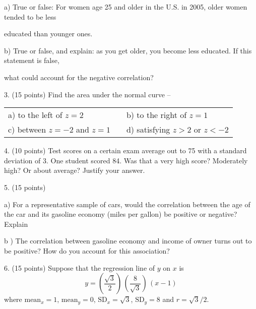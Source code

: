\documentclass[10pt]{article}
\begin{document}
\hspace{20pt} a) True or false:  For women age 25 and older in the U.S. in 2005, older women tended 
to be less\vspace{-5pt}

\hspace{20pt} \hphantom{a) }  educated than younger ones.
\bigskip

\hspace{20pt} b) True or false, and explain:  as you get older, you become less educated.  
If this statement is false,\vspace{-4pt}

\hspace{20pt} \hphantom{a) }
what could account for the negative correlation?  
\vspace{2in}


3. (15 points) Find the area under the normal curve --

\begin{center}
\begin{tabular}{lcl}
a) to the left of $z=2$ &   \hspace{2in} & b) to the right of $z=1$\\[1.2in]
c) between $z=-2$ and $z=1$   & & d) satisfying $z>2$ or $z<-2$
\end{tabular}
\end{center}
\vspace{1.2in}

4. (10 points) Test scores on a certain exam average out to 75 with a standard 
deviation of 3.  One student scored 84.   Was that a very high score?  Moderately high?  
Or about average?  Justify your answer.
\vfill
\eject
{\ }

5. (15 points) 

\hspace{20pt} a) For a representative sample of cars, would the correlation between the
age of the car and its gasoline economy (miles per gallon) be positive or negative?  Explain
\vspace{1.5in}

\hspace{20pt} b ) The correlation between gasoline economy and income of owner turns out to 
be positive?  How do you account for this association?
\vspace{1.5in}


6. (15 points) Suppose that the regression line of $y$ on $x$ 
is \[y=\left(\frac{\sqrt{3}}{2}\right)\,\left(\frac{8}{\sqrt{3}}\right)\,(x-1)\] 
where $\mbox{mean}_x=1$, $\mbox{mean}_y=0$, $\mbox{SD}_x=\sqrt{3}$, $\mbox{SD}_y=8$
and $r=\sqrt{3}/2$.\vspace{3pt}
\end{document}
